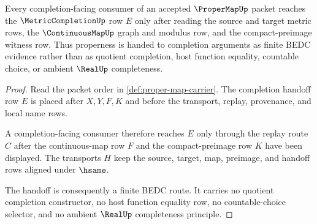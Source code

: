 \begin{theorem}
\label{thm:proper-map-completion-handoff}
Every completion-facing consumer of an accepted $\ProperMapUp$ packet reaches
the $\MetricCompletionUp$ row $E$ only after reading the source and target
metric rows, the $\ContinuousMapUp$ graph and modulus row, and the
compact-preimage witness row. Thus properness is handed to completion arguments
as finite BEDC evidence rather than as quotient completion, host function
equality, countable choice, or ambient $\RealUp$ completeness.
\end{theorem}
\begin{proof}
Read the packet order in \autoref{def:proper-map-carrier}. The completion
handoff row $E$ is placed after $X,Y,F,K$ and before the transport, replay,
provenance, and local name rows.

A completion-facing consumer therefore reaches $E$ only through the replay
route $C$ after the continuous-map row $F$ and the compact-preimage row $K$ have
been displayed. The transports $H$ keep the source, target, map, preimage, and
handoff rows aligned under $\hsame$.

The handoff is consequently a finite BEDC route. It carries no quotient
completion constructor, no host function equality row, no countable-choice
selector, and no ambient $\RealUp$ completeness principle.
\end{proof}




